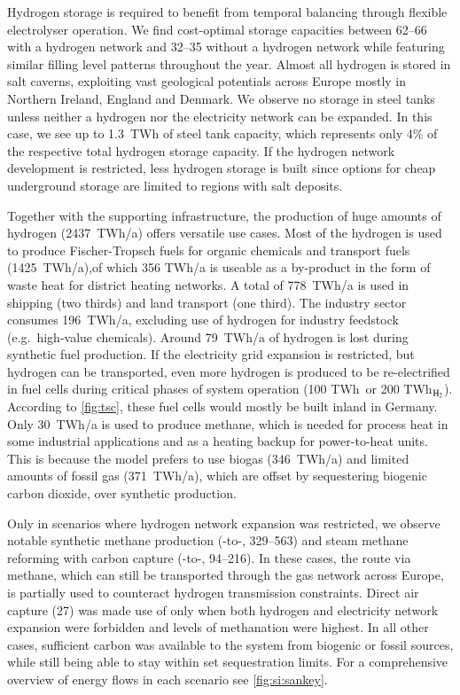 Hydrogen storage is required to benefit from temporal balancing through flexible
electrolyser operation. We find cost-optimal storage capacities between
\SIrange{62}{66}{\twh} with a hydrogen network and \SIrange{32}{35}{\twh}
without a hydrogen network while featuring similar filling level patterns
throughout the year. Almost all hydrogen is stored in salt caverns, exploiting
vast geological potentials across Europe mostly in Northern Ireland, England and
Denmark. We observe no storage in steel tanks unless neither a hydrogen nor the
electricity network can be expanded. In this case, we see up to 1.3~TWh of steel
tank capacity, which represents only 4\% of the respective total hydrogen
storage capacity. If the hydrogen network development is restricted, less
hydrogen storage is built since options for cheap underground storage are
limited to regions with salt deposits.

Together with the supporting infrastructure, the production of huge amounts of
hydrogen (2437~TWh/a) offers versatile use cases. Most of the hydrogen is used
to produce Fischer-Tropsch fuels for organic chemicals and transport fuels
(1425~TWh/a),of which 356 TWh/a is useable as a by-product in the form of waste
heat for district heating networks. A total of 778~TWh/a is used in shipping
(two thirds) and land transport (one third). The industry sector consumes
196~TWh/a, excluding use of hydrogen for industry feedstock (e.g.~high-value
chemicals). Around 79~TWh/a of hydrogen is lost during synthetic fuel
production. If the electricity grid expansion is restricted, but hydrogen can be
transported, even more hydrogen is produced to be re-electrified in fuel cells
during critical phases of system operation (100 TWh\el~or 200 TWh$_{\ce{H2}}$).
According to \cref{fig:tsc}, these fuel cells would mostly be built inland in
Germany. Only 30~TWh/a is used to produce methane, which is needed for process
heat in some industrial applications and as a heating backup for power-to-heat
units. This is because the model prefers to use biogas (346~TWh/a) and limited
amounts of fossil gas (371~TWh/a), which are offset by sequestering biogenic
carbon dioxide, over synthetic production.

Only in scenarios where hydrogen network expansion was restricted, we observe
notable synthetic methane production (-to-,
\SIrange{329}{563}{\twh}) and steam methane reforming with carbon capture
(-to-, \SIrange{94}{216}{\twh}). In these cases, the route via
methane, which can still be transported through the gas network across Europe,
is partially used to counteract hydrogen transmission constraints. Direct air
capture (\SI{27}{\tco}) was made use of only when both hydrogen and electricity
network expansion were forbidden and levels of methanation were highest. In all
other cases, sufficient carbon was available to the system from biogenic or
fossil sources, while still being able to stay within set sequestration limits.
For a comprehensive overview of energy flows in each scenario see
\cref{fig:si:sankey}.

